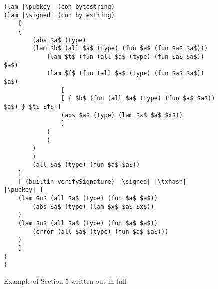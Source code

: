 \documentclass[../plutus-core-specification.tex]{subfiles}
\begin{document}
\begin{figure*}[h]  %
\begin{lstlisting}
(lam |\pubkey| (con bytestring)
(lam |\signed| (con bytestring)
    [ 
    {
        (abs $a$ (type)
        (lam $b$ (all $a$ (type) (fun $a$ (fun $a$ $a$)))
            (lam $t$ (fun (all $a$ (type) (fun $a$ $a$)) $a$)
            (lam $f$ (fun (all $a$ (type) (fun $a$ $a$)) $a$)
                [
                [ { $b$ (fun (all $a$ (type) (fun $a$ $a$)) $a$) } $t$ $f$ ]
                (abs $a$ (type) (lam $x$ $a$ $x$))
                ]
            )
            )
        )
        )
        (all $a$ (type) (fun $a$ $a$))
    }
    [ (builtin verifySignature) |\signed| |\txhash| |\pubkey| ]
    (lam $u$ (all $a$ (type) (fun $a$ $a$))
        (abs $a$ (type) (lam $x$ $a$ $x$))
    )
    (lam $u$ (all $a$ (type) (fun $a$ $a$))
        (error (all $a$ (type) (fun $a$ $a$)))
    )
    ]
)
)
\end{lstlisting}
\caption{Example of Section 5 written out in full}
\label{fig:Continuized_Let_Example}
\end{figure*}
\end{document}
